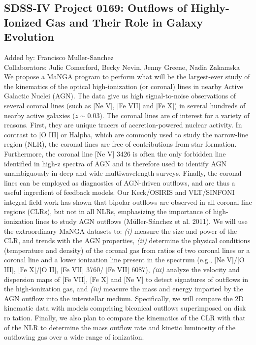 \documentclass[11pt]{article}
\begin{document}
     \subsection{SDSS-IV Project 0169: Outflows of Highly-Ionized Gas and Their Role in Galaxy Evolution}
     Added by: Francisco Muller-Sanchez\\
     Collaborators:  Julie Comerford, Becky Nevin, Jenny Greene, Nadia Zakamska \\

     \noindent
     We propose a MaNGA program to perform what will be the largest-ever
     study of the kinematics of the optical high-ionization (or coronal)
     lines in nearby Active Galactic Nuclei (AGN). The data give us high
     signal-to-noise observations of several coronal lines (such as [Ne V],
     [Fe VII] and [Fe X]) in several hundreds of nearby active galaxies
     ($z\sim0.03$). The coronal lines are of interest for a variety of
     reasons. First, they are unique tracers of accretion-powered nuclear
     activity. In contrast to [O III] or Halpha, which are commonly used to
     study the narrow-line region (NLR), the coronal lines are free of
     contributions from star formation. Furthermore, the coronal line [Ne
     V] 3426 is often the only forbidden line identified in high-z spectra
     of AGN and is therefore used to identify AGN unambiguously in deep and
     wide multiwavelength surveys. Finally, the coronal lines can be
     employed as diagnostics of AGN-driven outflows, and are thus a useful
     ingredient of feedback models. Our Keck/OSIRIS and VLT/SINFONI
     integral-field work has shown that bipolar outflows are observed in
     all coronal-line regions (CLRs), but not in all NLRs, emphasizing the
     importance of high-ionization lines to study AGN outflows
     (Müller-Sánchez et al. 2011). We will use the extraordinary MaNGA
     datasets to: {\it (i)} measure the size and power of the CLR, and trends
     with the AGN properties, {\it (ii)} determine the physical conditions
     (temperature and density) of the coronal gas from ratios of two
     coronal lines or a coronal line and a lower ionization line present in
     the spectrum (e.g., [Ne V]/[O III], [Fe X]/[O II], [Fe VII] 3760/ [Fe
     VII] 6087), {\it (iii)} analyze the velocity and dispersion maps of [Fe
     VII], [Fe X] and [Ne V] to detect signatures of outflows in the
     high-ionization gas, and {\it (iv)} measure the mass and energy imparted by
     the AGN outflow into the interstellar medium. Specifically, we will
     compare the 2D kinematic data with models comprising biconical
     outflows superimposed on disk ro tation. Finally, we also plan to
     compare the kinematics of the CLR with that of the NLR to determine
     the mass outflow rate and kinetic luminosity of the outflowing gas
     over a wide range of ionization.
     
\end{document}
